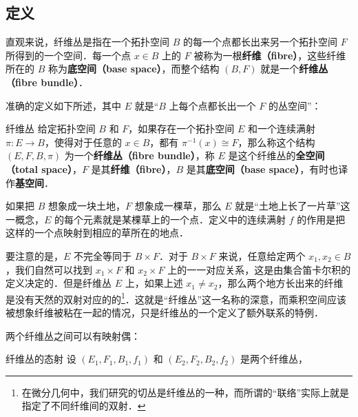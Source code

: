 
\begin{issues}
\issueDraft
\end{issues}


\subsection{定义}

直观来说，纤维丛是指在一个拓扑空间 $B$ 的每一个点都长出来另一个拓扑空间 $F$ 所得到的一个空间．每一个点 $x\in B$ 上的 $F$ 被称为一根\textbf{纤维（fibre）}，这些纤维所在的 $B$ 称为\textbf{底空间（base space）}，而整个结构 $(B, F)$ 就是一个\textbf{纤维丛（fibre bundle）}．

准确的定义如下所述，其中 $E$ 就是“$B$ 上每个点都长出一个 $F$ 的丛空间”：

\begin{definition}{纤维丛}
给定拓扑空间 $B$ 和 $F$，如果存在一个拓扑空间 $E$ 和一个连续满射 $\pi:E\rightarrow B$，使得对于任意的 $x\in B$，都有 $\pi^{-1}(x)\cong F$，那么称这个结构 $(E, F, B, \pi)$ 为一个\textbf{纤维丛（fibre bundle）}，称 $E$ 是这个纤维丛的\textbf{全空间（total space）}，$F$ 是其\textbf{纤维（fibre）}，$B$ 是其\textbf{底空间（base space）}，有时也译作\textbf{基空间}．
\end{definition}

如果把 $B$ 想象成一块土地，$F$ 想象成一棵草，那么 $E$ 就是“土地上长了一片草”这一概念，$E$ 的每个元素就是某棵草上的一个点．定义中的连续满射 $f$ 的作用是把这样的一个点映射到相应的草所在的地点．

要注意的是，$E$ 不完全等同于 $B\times F$．对于 $B\times F$ 来说，任意给定两个 $x_1, x_2\in B$，我们自然可以找到 $x_1\times F$ 和 $x_2\times F$ 上的一一对应关系，这是由集合笛卡尔积的定义决定的．但是纤维丛 $E$ 上，如果上述 $x_1\not=x_2$，那么两个地方长出来的纤维是没有天然的双射对应的的\footnote{在微分几何中，我们研究的切丛是纤维丛的一种，而所谓的“联络”实际上就是指定了不同纤维间的双射．}．这就是“纤维丛”这一名称的深意，而乘积空间应该被想象纤维被粘在一起的情况，只是纤维丛的一个定义了额外联系的特例．

两个纤维丛之间可以有映射偶：

\begin{definition}{纤维丛的态射}
设 $(E_1, F_1, B_1, f_1)$ 和 $(E_2, F_2, B_2, f_2)$ 是两个纤维丛，
\end{definition}

